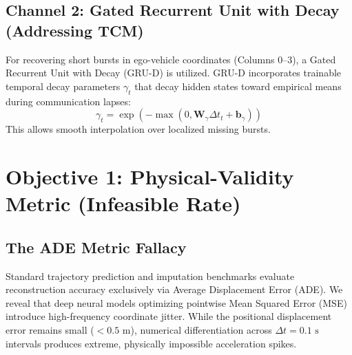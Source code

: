 \documentclass[11pt,a4paper]{article}
\begin{document}
\subsection{Channel 2: Gated Recurrent Unit with Decay (Addressing TCM)}
For recovering short bursts in ego-vehicle coordinates (Columns 0--3), a Gated Recurrent Unit with Decay (GRU-D) is utilized. GRU-D incorporates trainable temporal decay parameters $\gamma_t$ that decay hidden states toward empirical means during communication lapses:
\begin{equation}
    \gamma_t = \exp\left(-\max(0, \mathbf{W}_\gamma \Delta t_t + \mathbf{b}_\gamma)\right)
\end{equation}
This allows smooth interpolation over localized missing bursts.

\vspace{0.8em}

\section{Objective 1: Physical-Validity Metric (Infeasible Rate)}

\subsection{The ADE Metric Fallacy}
Standard trajectory prediction and imputation benchmarks evaluate reconstruction accuracy exclusively via Average Displacement Error (ADE). We reveal that deep neural models optimizing pointwise Mean Squared Error (MSE) introduce high-frequency coordinate jitter. While the positional displacement error remains small ($< 0.5\text{ m}$), numerical differentiation across $\Delta t = 0.1\text{ s}$ intervals produces extreme, physically impossible acceleration spikes.
\end{document}
